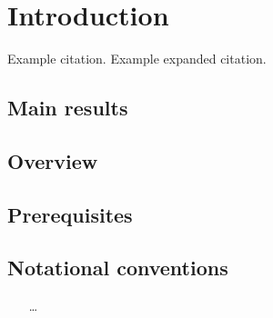 \chapter{Introduction}

Example citation.\cite{Foncesca-Vaidya_nonorientable} Example expanded citation.\parencite[Remark 3.8]{Mathai_math-review}

\section{Main results}

\section{Overview}

\section{Prerequisites}

\section{Notational conventions}

{\color{blue}
\begin{itemize}
	\item [\dots]  %
\end{itemize}
}